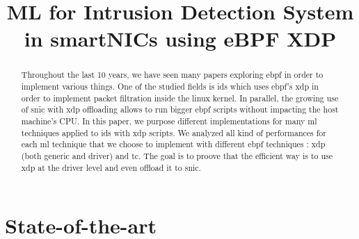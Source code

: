 \documentclass[conference]{IEEEtran}
\begin{document}
\title{ML for Intrusion Detection System in smartNICs using eBPF XDP}

\author{
}

\maketitle


\begin{abstract}
    Throughout the last 10 years, we have seen many papers exploring \gls{ebpf} in order to implement various things. One of the studied fields is \gls{ids} which uses \gls{ebpf}'s \gls{xdp} in order to implement packet filtration inside the linux kernel. In parallel, the growing use of \gls{snic} with \gls{xdp} offloading allows to run bigger \gls{ebpf} scripts without impacting the host machine's CPU. In this paper, we purpose different implementations for many \gls{ml} techniques applied to \gls{ids} with \gls{xdp} scripts. We analyzed all kind of performances for each \gls{ml} technique that we choose to implement with different \gls{ebpf} techniques : \gls{xdp} (both generic and driver) and \gls{tc}. The goal is to proove that the efficient way is to use \gls{xdp} at the driver level and even offload it to \gls{snic}.
    

\end{abstract}


\section{State-of-the-art}
\end{document}
